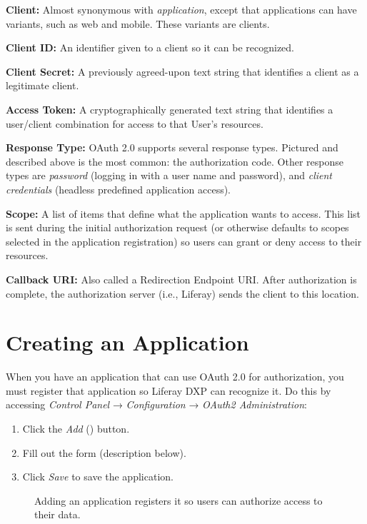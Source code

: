 \textbf{Client:} Almost synonymous with \emph{application}, except that
applications can have variants, such as web and mobile. These variants
are clients.

\textbf{Client ID:} An identifier given to a client so it can be
recognized.

\textbf{Client Secret:} A previously agreed-upon text string that
identifies a client as a legitimate client.

\textbf{Access Token:} A cryptographically generated text string that
identifies a user/client combination for access to that User's
resources.

\textbf{Response Type:} OAuth 2.0 supports several response types.
Pictured and described above is the most common: the authorization code.
Other response types are \emph{password} (logging in with a user name
and password), and \emph{client credentials} (headless predefined
application access).

\textbf{Scope:} A list of items that define what the application wants
to access. This list is sent during the initial authorization request
(or otherwise defaults to scopes selected in the application
registration) so users can grant or deny access to their resources.

\textbf{Callback URI:} Also called a Redirection Endpoint URI. After
authorization is complete, the authorization server (i.e., Liferay)
sends the client to this location.

\section{Creating an Application}\label{creating-an-application}

When you have an application that can use OAuth 2.0 for authorization,
you must register that application so Liferay DXP can recognize it. Do
this by accessing \emph{Control Panel} → \emph{Configuration} →
\emph{OAuth2 Administration}:

\begin{enumerate}
\def\labelenumi{\arabic{enumi}.}
\item
  Click the \emph{Add}
  ()
  button.
\item
  Fill out the form (description below).
\item
  Click \emph{Save} to save the application.
\end{enumerate}

\begin{figure}
\centering
{}
\caption{Adding an application registers it so users can authorize
access to their data.}
\end{figure}

